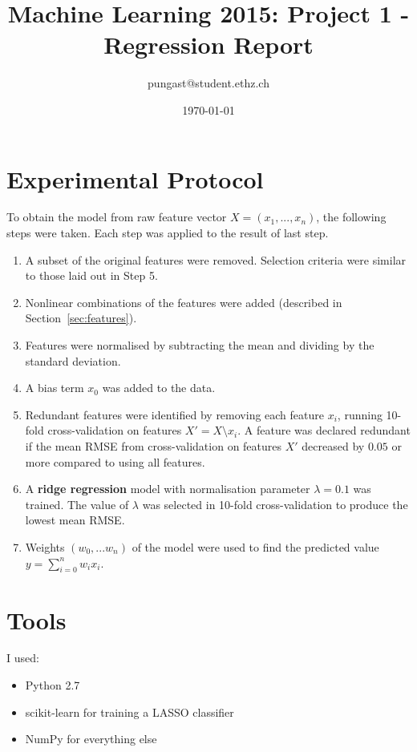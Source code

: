 \documentclass[a4paper, 11pt]{article}
\title{Machine Learning 2015: Project 1 - Regression Report}
\author{pungast@student.ethz.ch}
\date{\today}
\begin{document}
\maketitle

\section*{Experimental Protocol}

To obtain the model from raw feature vector $X = (x_1, ..., x_n)$, the following steps were taken. Each step was applied to the result of last step.

\begin{enumerate}
	\item A subset of the original features were removed. Selection criteria were similar to those laid out in Step 5.
	\item Nonlinear combinations of the features were added (described in Section~\ref{sec:features}).
	\item Features were normalised by subtracting the mean and dividing by the standard deviation.
	\item A bias term $x_0$ was added to the data.
	\item Redundant features were identified by removing each feature $x_i$, running 10-fold cross-validation on features $X' = X \setminus x_i$. A feature was declared redundant if the mean RMSE from cross-validation on features $X'$ decreased by $0.05$ or more compared to using all features.
	\item A \textbf{ridge regression} model with normalisation parameter $\lambda=0.1$ was trained. The value of $\lambda$ was selected in 10-fold cross-validation to produce the lowest mean RMSE.
	\item Weights $(w_0,...w_n)$ of the model were used to find the predicted value $y = \sum_{i=0}^{n} w_i x_i$.
\end{enumerate}

\section{Tools}
I used:

\begin{itemize}
	\item Python 2.7
	\item scikit-learn for training a LASSO classifier
	\item NumPy for everything else
\end{itemize}
\end{document}
